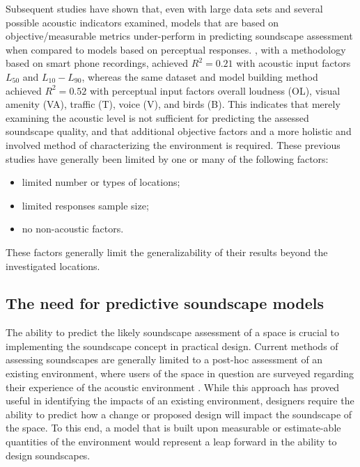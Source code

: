 Subsequent studies have shown that, even with large data sets and several possible acoustic indicators examined, models that are based on objective/measurable metrics under-perform in predicting soundscape assessment when compared to models based on perceptual responses. \citet{Ricciardi2015Sound}, with a methodology based on smart phone recordings, achieved $R^2 = 0.21$ with acoustic input factors $L_{50}$ and $L_{10} - L_{90}$, whereas the same dataset and model building method achieved $R^2 = 0.52$ with perceptual input factors overall loudness (OL), visual amenity (VA), traffic (T), voice (V), and birds (B). This indicates that merely examining the acoustic level is not sufficient for predicting the assessed soundscape quality, and that additional objective factors and a more holistic and involved method of characterizing the environment is required. These previous studies have generally been limited by one or many of the following factors:

\begin{itemize}
  \item limited number or types of locations;
  \item limited responses sample size;
  \item no non-acoustic factors.
\end{itemize}
These factors generally limit the generalizability of their results beyond the investigated locations.

\subsection{The need for predictive soundscape models}
The ability to predict the likely soundscape assessment of a space is crucial to implementing the soundscape concept in practical design. Current methods of assessing soundscapes are generally limited to a post-hoc assessment of an existing environment, where users of the space in question are surveyed regarding their experience of the acoustic environment \citep{Engel2018Review, Zhang2018Effect}. While this approach has proved useful in identifying the impacts of an existing environment, designers require the ability to predict how a change or proposed design will impact the soundscape of the space. To this end, a model that is built upon measurable or estimate-able quantities of the environment would represent a leap forward in the ability to design soundscapes.

